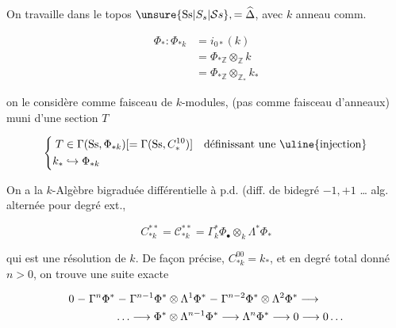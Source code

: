 
On travaille dans le topos  $\unsure{\mathrm{Ss}|S_s|\mathcal{S}s},=\widehat{\Delta}$, avec $k$ anneau comm.

\[
\begin{aligned}
\Phi_*:\Phi_{*k}&=i_{0*}(k)\\
&=\Phi_{*\mathbb Z}\otimes_{\mathbb Z}k\\
&=\Phi_{*\mathbb Z}\otimes_{\mathbb Z_*}k_*
\end{aligned}
\]

 on le considère comme faisceau de $k$-modules, (pas comme faisceau d'anneaux) muni d'une section $T$

\[
\left\{\begin{aligned}
T&\in\Gamma(\mathrm{Ss},\Phi_{*k})[=\Gamma(\mathrm{Ss},C^{10}_*)]\quad\text{définissant une \uline{injection}}\\
k_*&\hookrightarrow\Phi_{*k}
\end{aligned}\right.
\]

On a la $k$-Algèbre bigraduée  différentielle à p.d. (diff. de bidegré $-1,+1$ \ldots{}  alg. alternée pour degré ext.,

\[
C^{**}_{*k}=\mathcal{C}^{**}_{*k}=\Gamma^*_{k}\Phi_\bullet\otimes_k\Lambda^*\Phi_*
\]


qui est une résolution de $k$. De façon précise, $C^{00}_{*k}=k_*$, et en degré total donné $n>0$, on trouve une suite exacte

\[
\begin{aligned}
0\relbar\Gamma^n\Phi^*&\relbar\Gamma^{n-1}\Phi^*\otimes\Lambda^1\Phi^*
\relbar\Gamma^{n-2}\Phi^*\otimes\Lambda^2\Phi^*\longrightarrow\\
&\ldots\longrightarrow\Phi^*\otimes\Lambda^{n-1}\Phi^*\longrightarrow
\Lambda^n\Phi^*\longrightarrow0\longrightarrow0\ldots
\end{aligned}
\]

